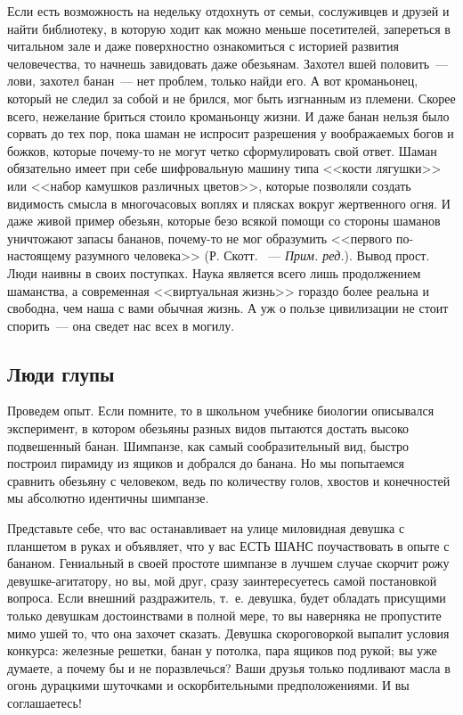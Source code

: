 \documentclass{scrbook}
\newcommand{\flqq}{<<}
\newcommand{\frqq}{>>}
\newcommand{\mdash}{~--- }
\newcommand{\essaysection}[1]{\subsection*{#1}\nopagebreak}
\newcommand{\mycomment}[1]{{\mdash} \textit{#1}}
\begin{document}
Если есть возможность на недельку отдохнуть от семьи, сослуживцев и друзей и найти библиотеку, в которую ходит как можно меньше посетителей, запереться в читальном зале и даже поверхностно ознакомиться с историей развития человечества, то начнешь завидовать даже обезьянам. Захотел вшей половить{\mdash}лови, захотел банан{\mdash}нет проблем, только найди его. А вот кроманьонец, который не следил за собой и не брился, мог быть изгнанным из племени. Скорее всего, нежелание бриться стоило кроманьонцу жизни. И даже банан нельзя было сорвать до тех пор, пока шаман не испросит разрешения у воображаемых богов и божков, которые почему-то не могут четко сформулировать свой ответ. Шаман обязательно имеет при себе шифровальную машину типа {\flqq}кости лягушки{\frqq} или {\flqq}набор камушков различных цветов{\frqq}, которые позволяли создать видимость смысла в многочасовых воплях и плясках вокруг жертвенного огня. И даже живой пример обезьян, которые безо всякой помощи со стороны шаманов уничтожают запасы бананов, почему-то не мог образумить {\flqq}первого по-настоящему разумного человека{\frqq} (Р. Скотт. \mycomment{Прим. ред.}).
Вывод прост. Люди наивны в своих поступках. Наука является всего лишь продолжением шаманства, а современная {\flqq}виртуальная жизнь{\frqq} гораздо более реальна и свободна, чем наша с вами обычная жизнь. А уж о пользе цивилизации не стоит спорить{\mdash}она сведет нас всех в могилу.

\essaysection{Люди глупы}

Проведем опыт. Если помните, то в школьном учебнике биологии описывался эксперимент, в котором обезьяны разных видов пытаются достать высоко подвешенный банан. Шимпанзе, как самый сообразительный вид, быстро построил пирамиду из ящиков и добрался до банана. Но мы попытаемся сравнить обезьяну с человеком, ведь по количеству голов, хвостов и конечностей мы абсолютно идентичны шимпанзе.

Представьте себе, что вас останавливает на улице миловидная девушка с планшетом в руках и объявляет, что у вас ЕСТЬ ШАНС поучаствовать в опыте с бананом. Гениальный в своей простоте шимпанзе в лучшем случае скорчит рожу девушке-агитатору, но вы, мой друг, сразу заинтересуетесь самой постановкой вопроса. Если внешний раздражитель, т.~е. девушка, будет обладать присущими только девушкам достоинствами в полной мере, то вы наверняка не пропустите мимо ушей то, что она захочет сказать. Девушка скороговоркой выпалит условия конкурса: железные решетки, банан у потолка, пара ящиков под рукой; вы уже думаете, а почему бы и не поразвлечься? Ваши друзья только подливают масла в огонь дурацкими шуточками и оскорбительными предположениями. И вы соглашаетесь!
\end{document}
